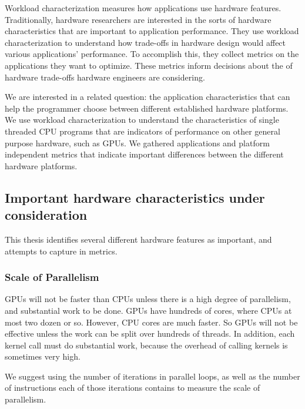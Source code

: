 \documentclass[12pt,twoside]{reedthesis}
\begin{document}
		Workload characterization measures how applications use hardware features. %
		Traditionally, hardware researchers are interested in the sorts of hardware characteristics that are important to application performance. They use workload characterization to understand how trade-offs in hardware design would affect various applications' performance. To accomplish this, they collect metrics on the applications they want to optimize. These metrics inform decisions about the of hardware trade-offs hardware engineers are considering. 
		
		We are interested in a related question: the application characteristics that can help the programmer choose between different established hardware platforms. We use workload characterization to understand the characteristics of single threaded CPU programs that are indicators of performance on other general purpose hardware, such as GPUs. We gathered applications and platform independent metrics that indicate important differences between the different hardware platforms. 
		
		\subsection{Important hardware characteristics under consideration}
		
		This thesis identifies several different hardware features as important, and attempts to capture in metrics. 
		
		\subsubsection{Scale of Parallelism}
		
		GPUs will not be faster than CPUs unless there is a high degree of parallelism, and substantial work to be done. GPUs have hundreds of cores, where CPUs at most two dozen or so. However, CPU cores are much faster. So GPUs will not be effective unless the work can be split over hundreds of threads. In addition, each kernel call must do substantial work, because the overhead of calling kernels is sometimes very high.  
		
		We suggest using the number of iterations in parallel loops, as well as the number of instructions each of those iterations contains to measure the scale of parallelism.
		
\end{document}

